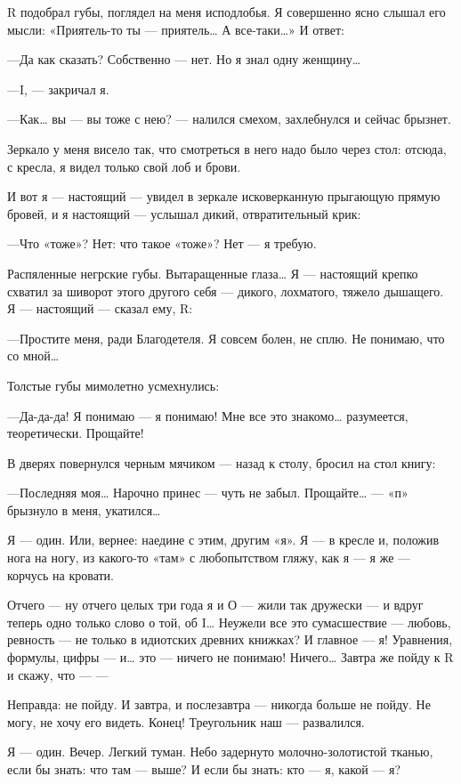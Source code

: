 \documentclass[11pt,openany]{book}
\begin{document}
R подобрал губы, поглядел на меня исподлобья. Я совершенно ясно слышал его мысли: «Приятель-то ты --- приятель\ldots{} А все-таки\ldots{}» И ответ:

---Да как сказать? Собственно --- нет. Но я знал одну женщину\ldots{}

---I, --- закричал я.

---Как\ldots{} вы --- вы тоже с нею? --- налился смехом, захлебнулся и сейчас брызнет.

Зеркало у меня висело так, что смотреться в него надо было через стол: отсюда, с кресла, я видел только свой лоб и брови.

И вот я --- настоящий --- увидел в зеркале исковерканную прыгающую прямую бровей, и я настоящий --- услышал дикий, отвратительный крик:

---Что «тоже»? Нет: что такое «тоже»? Нет --- я требую.

Распяленные негрские губы. Вытаращенные глаза\ldots{} Я --- настоящий крепко схватил за шиворот этого другого себя --- дикого, лохматого, тяжело дышащего. Я --- настоящий --- сказал ему, R:

---Простите меня, ради Благодетеля. Я совсем болен, не сплю. Не понимаю, что со мной\ldots{}

Толстые губы мимолетно усмехнулись:

---Да-да-да! Я понимаю --- я понимаю! Мне все это знакомо\ldots{} разумеется, теоретически. Прощайте!

В дверях повернулся черным мячиком --- назад к столу, бросил на стол книгу:

---Последняя моя\ldots{} Нарочно принес --- чуть не забыл. Прощайте\ldots{} --- «п» брызнуло в меня, укатился\ldots{}

Я --- один. Или, вернее: наедине с этим, другим «я». Я --- в кресле и, положив нога на ногу, из какого-то «там» с любопытством гляжу, как я --- я же --- корчусь на кровати.

Отчего --- ну отчего целых три года я и О --- жили так дружески --- и вдруг теперь одно только слово о той, об I\ldots{} Неужели все это сумасшествие --- любовь, ревность --- не только в идиотских древних книжках? И главное --- я! Уравнения, формулы, цифры --- и\ldots{} это --- ничего не понимаю! Ничего\ldots{} Завтра же пойду к R и скажу, что --- ---

Неправда: не пойду. И завтра, и послезавтра --- никогда больше не пойду. Не могу, не хочу его видеть. Конец! Треугольник наш --- развалился.

Я --- один. Вечер. Легкий туман. Небо задернуто молочно-золотистой тканью, если бы знать: что там --- выше? И если бы знать: кто --- я, какой --- я?
\end{document}
